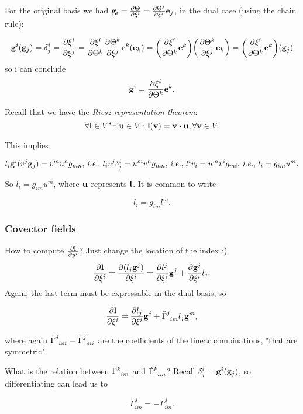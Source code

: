 \documentclass[../main.tex]{subfiles}
\begin{document}
For the original basis we had $\vb{g}_i = \pdv{\vb*{\Theta}}{\xi^i} = \pdv{\Theta^j}{\xi^i}\vb{e}_j$, in the dual case (using the chain rule):

\[
	\vb{g}^i\qty(\vb{g}_j) = \delta^i_j = \pdv{\xi^i}{\xi^j}= \pdv{\xi^i}{\Theta^k}\pdv{\Theta^k}{\xi^j} \vb{e}^k(\vb{e}_k) = \qty(\pdv{\xi^i}{\Theta^k}\vb{e}^k)\qty(\pdv{\Theta^k}{\xi^j}\vb{e}_k) = \qty(\pdv{\xi^i}{\Theta^k}\vb{e}^k)\qty(\vb{g}_j)
\]
so i can conclude
\[
	\vb{g}^i = \pdv{\xi^i}{\Theta^k}\vb{e}^k.
\]

Recall that we have the \textit{Riesz representation theorem}:
\[
	\forall \vb{l} \in V^{*} \exists ! \vb{u} \in V: \vb{l}(\vb{v}) = \vb{v} \vdot \vb{u}, \forall \vb{v} \in V.
\]

This implies

\[
	l_i \vb{g}^i (v^j \vb{g}_j) = v^m u^n g_{mn}, \, \text{\textit{i.e.}}, \, l_i v^j \delta^i_j = u^m v^n g_{mn}, \, \text{\textit{i.e.}}, \, l^i v_i = u^m v^i g_{mi}, \, \text{\textit{i.e.}}, \,l_i = g_{im} u^m.
\]

So $l_i = g_{im}u^m$, where $\vb{u}$ represents $\vb{l}$. It is common to write

\[
	l_i = g_{im}l^m.
\]

\subsubsection{Covector fields}
\label{sec:covector_fields}

How to compute $\pdv{\vb{l}}{y^i}$? Just change the location of the index :)
\[
	\pdv{\vb{l}}{\xi^i} = \pdv{(l_j \vb{g}^j)}{\xi^i} = \pdv{l^j}{\xi^i}\vb{g}^j + \pdv{\vb{g}^j}{\xi^i}l_j.
\]
Again, the last term must be expressable in the dual basis, so 

\begin{equation}
	\pdv{\vb{l}}{\xi^i}= \pdv{l_j}{\xi^i}\vb{g}^j+ \tilde{\Gamma}\indices{^j_{im}} l_j \vb{g}^m,
\end{equation}


where again $\tilde{\Gamma}\indices{^j_{im}} = \tilde{\Gamma}\indices{^j_{mi}}$ are the coefficients of the linear combinations, "that are symmetric".

What is the relation between $\Gamma \indices{^k_{im}}$ and $\tilde{\Gamma}\indices{^k_{im}}$? Recall $\delta^i_j = \vb{g}^i(\vb{g}_j)$, so differentiating can lead us to

\begin{equation}
	\label{eq:relationGammas}
    \Gamma^j_{im} = - \Gamma^j_{im}.
\end{equation}
\end{document}
